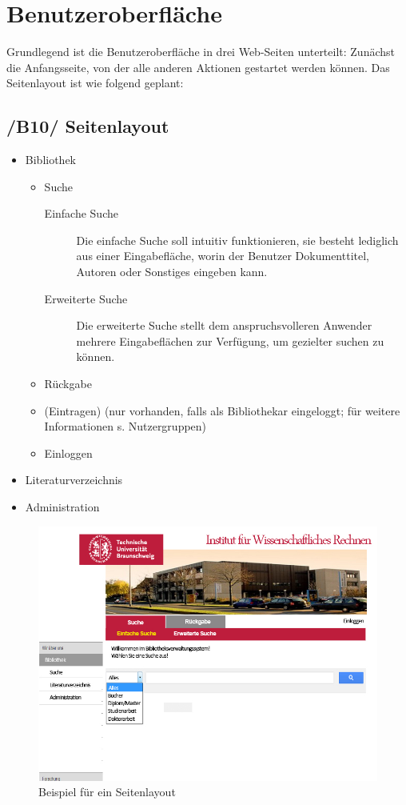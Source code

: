 \chapter{Benutzeroberfläche}

Grundlegend ist die Benutzeroberfläche in drei Web-Seiten unterteilt:
Zunächst die Anfangsseite, von der alle anderen Aktionen gestartet werden können.
Das Seitenlayout ist wie folgend geplant:


\section{/B10/ Seitenlayout}

 \begin{itemize}
   \item Bibliothek
   \begin{itemize}
    \item Suche
      \begin{description}
       \item[Einfache Suche] Die einfache Suche soll intuitiv funktionieren, sie besteht lediglich aus einer Eingabefläche, worin der Benutzer
       Dokumenttitel, Autoren oder Sonstiges eingeben kann. 
       \item[Erweiterte Suche] Die erweiterte Suche stellt dem anspruchsvolleren Anwender mehrere Eingabeflächen zur Verfügung, um gezielter suchen zu können.
       \end{description}
      \item Rückgabe
      \item (Eintragen) (nur vorhanden, falls als Bibliothekar eingeloggt; für weitere Informationen s. Nutzergruppen)
      \item Einloggen
    \end{itemize}
    \item Literaturverzeichnis
    \item Administration
 \end{itemize}
 
\begin{figure}
\includegraphics[width=0.8\linewidth]{bilder/layout2.jpg}
\caption{Beispiel für ein Seitenlayout}
\label{fig:gui}
\end{figure}

